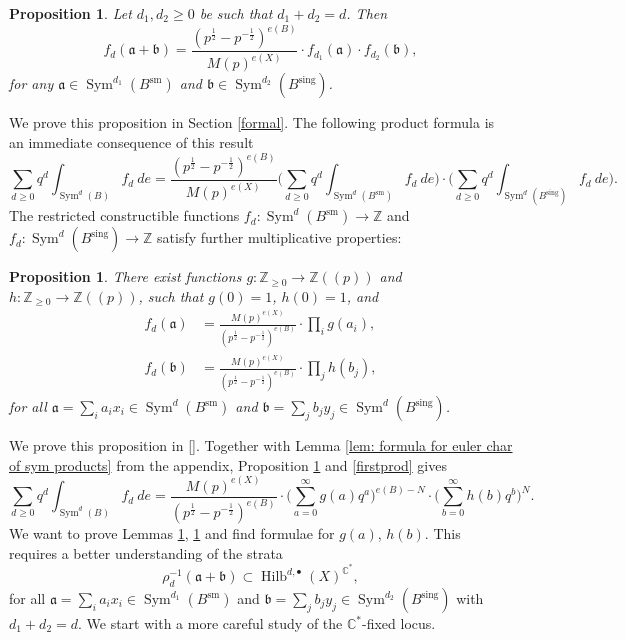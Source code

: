 \documentclass{amsart}
\newtheorem{proposition}[theorem]{Proposition}
\theoremstyle{definition}
\newcommand{\CC} {\mathbb{C}}          %
\newcommand{\ZZ} {\mathbb{Z}}		%
\newcommand{\Sym}{\operatorname{Sym}}
\newcommand{\Hilb}{\operatorname{Hilb}}
\newcommand{\sm}{\operatorname{sm}}
\newcommand{\sing}{\operatorname{sing}}
\begin{document}
\begin{proposition} \label{mult1}
Let $d_1, d_2 \geq 0$ be such that $d_1+d_2 = d$. Then 
$$ 
f_d(\mathfrak{a} + \mathfrak{b}) =\frac{(p^{\frac{1}{2}} - p^{-\frac{1}{2}})^{e(B)}}{M(p)^{e(X)}} \cdot f_{d_1}(\mathfrak{a}) \cdot f_{d_2}(\mathfrak{b}), 
$$
for any $\mathfrak{a} \in \Sym^{d_1}(B^{\sm})$ and $\mathfrak{b} \in \Sym^{d_2}(B^{\sing})$. 
\end{proposition}
We prove this proposition in Section \ref{formal}. The following product formula is an immediate consequence of this result
\begin{equation} \label{firstprod}
\sum_{d \geq 0} q^d \int_{\Sym^d(B)} f_d \ de = \frac{(p^{\frac{1}{2}} - p^{-\frac{1}{2}})^{e(B)}}{M(p)^{e(X)}}  \Big( \sum_{d \geq 0} q^d \int_{\Sym^d(B^{\sm})} f_d \ de \Big) \cdot \Big( \sum_{d \geq 0} q^d \int_{\Sym^d(B^{\sing})} f_d \ de \Big). 
\end{equation}
The restricted constructible functions $f_d  : \Sym^d(B^{\sm}) \rightarrow \ZZ$ and $f_d  : \Sym^d(B^{\sing}) \rightarrow \ZZ$ satisfy further multiplicative properties:
\begin{proposition} \label{mult2}
There exist functions $g : \ZZ_{\geq 0} \rightarrow \ZZ(\!(p)\!)$ and $h : \ZZ_{\geq 0} \rightarrow \ZZ(\!(p)\!)$, such that $g(0)=1$, $h(0)=1$, and
\begin{align*}
f_{d}(\mathfrak{a}) &= \frac{M(p)^{e(X)}}{(p^{\frac{1}{2}} - p^{-\frac{1}{2}})^{e(B)}} \cdot \prod_{i} g(a_i), \\
f_{d}(\mathfrak{b}) &= \frac{M(p)^{e(X)}}{(p^{\frac{1}{2}} - p^{-\frac{1}{2}})^{e(B)}} \cdot \prod_{j} h(b_j), 
\end{align*}
for all $\mathfrak{a} = \sum_i a_i x_i \in \Sym^{d}(B^{\sm})$ and $\mathfrak{b} = \sum_j b_j y_j \in \Sym^{d}(B^{\sing})$.
\end{proposition}
We prove this proposition in \ref{}. Together with Lemma \ref{lem: formula for euler char of sym products} from the appendix, Proposition \ref{mult2} and \eqref{firstprod} gives
$$
\sum_{d \geq 0} q^d \int_{\Sym^d(B)} f_d \ de = \frac{M(p)^{e(X)}}{(p^{\frac{1}{2}} - p^{-\frac{1}{2}})^{e(B)}} \cdot \Big( \sum_{a=0}^{\infty} g(a) q^a \Big)^{e(B) - N} \cdot \Big( \sum_{b=0}^{\infty} h(b) q^b \Big)^N.
$$
We want to prove Lemmas \ref{mult1}, \ref{mult2} and find formulae for $g(a)$, $h(b)$. This requires a better understanding of the strata
$$
\rho_{d}^{-1} (\mathfrak{a} + \mathfrak{b}) \subset \Hilb^{d, \bullet}(X)^{\CC^*},
$$
for all $\mathfrak{a} = \sum_i a_i x_i \in \Sym^{d_1}(B^{\sm})$ and $\mathfrak{b} = \sum_j b_j y_j \in \Sym^{d_2}(B^{\sing})$ with $d_1+d_2=d$. We start with a more careful study of the $\CC^*$-fixed locus.
\end{document}

